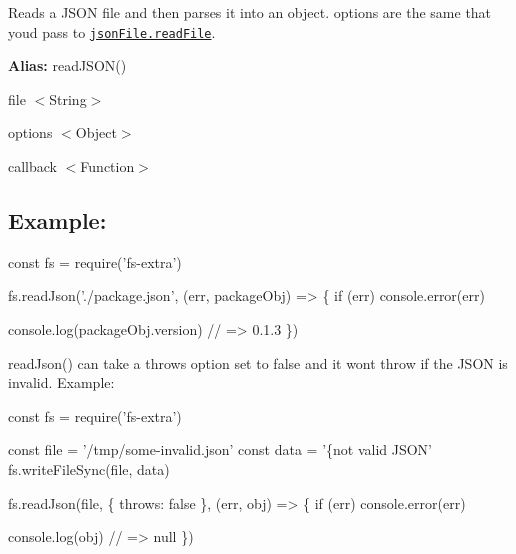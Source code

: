 Reads a J\+S\+ON file and then parses it into an object. {\ttfamily options} are the same that you\textquotesingle{}d pass to \href{https://github.com/jprichardson/node-jsonfile#readfilefilename-options-callback}{\tt {\ttfamily json\+File.\+read\+File}}.

{\bfseries Alias\+:} {\ttfamily read\+J\+S\+O\+N()}


\begin{DoxyItemize}
\item {\ttfamily file} {\ttfamily $<$String$>$}
\item {\ttfamily options} {\ttfamily $<$Object$>$}
\item {\ttfamily callback} {\ttfamily $<$Function$>$}
\end{DoxyItemize}

\subsection*{Example\+:}


\begin{DoxyCode}
const fs = require('fs-extra')

fs.readJson('./package.json', (err, packageObj) => \{
  if (err) console.error(err)

  console.log(packageObj.version) // => 0.1.3
\})
\end{DoxyCode}
 



{\ttfamily read\+Json()} can take a {\ttfamily throws} option set to {\ttfamily false} and it won\textquotesingle{}t throw if the J\+S\+ON is invalid. Example\+:


\begin{DoxyCode}
const fs = require('fs-extra')

const file = '/tmp/some-invalid.json'
const data = '\{not valid JSON'
fs.writeFileSync(file, data)

fs.readJson(file, \{ throws: false \}, (err, obj) => \{
  if (err) console.error(err)

  console.log(obj) // => null
\})
\end{DoxyCode}
 